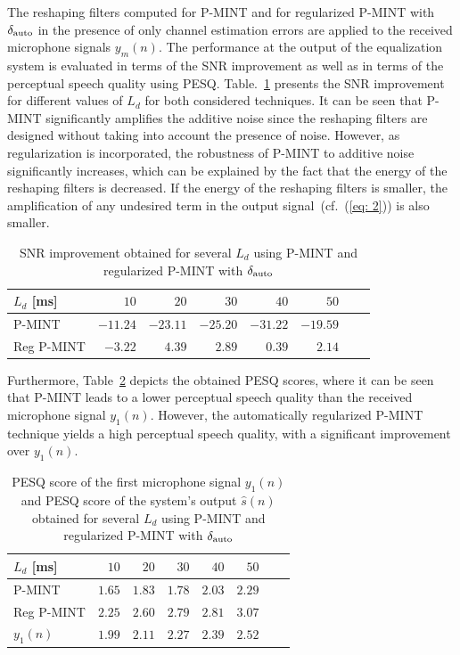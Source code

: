 \documentclass[10pt]{IEEEtran}
\begin{document}
The reshaping filters computed for P-MINT and for regularized P-MINT with $\delta_{\rm auto}$ in the presence of only channel estimation errors are applied to the received microphone signals $y_m(n)$.
The performance at the output of the equalization system is evaluated in terms of the SNR improvement as well as in terms of the perceptual speech quality using PESQ.
Table.~\ref{tbl: snr} presents the SNR improvement for different values of $L_d$ for both considered techniques.
It can be seen that P-MINT significantly amplifies the additive noise since the reshaping filters are designed without taking into account the presence of noise.
However, as regularization is incorporated, the robustness of P-MINT to additive noise significantly increases, which can be explained by the fact that the energy of the reshaping filters is decreased.
If the energy of the reshaping filters is smaller, the amplification of any undesired term in the output signal~(cf.~(\ref{eq: 2})) is also smaller.
\begin{table}[b!]
\centering
\caption{SNR improvement obtained for several $L_d$ using P-MINT and regularized P-MINT with $\delta_{\rm auto}$}
\label{tbl: snr}
\begin{tabular}{|l|r|r|r|r|r|r|r|}
\hline
$L_d$ [ms] & $10$ & $20$ & $30$ & $40$ & $50$ \\
\hline
P-MINT & $-11.24$ & $-23.11$ & $-25.20$ & $-31.22$ & $-19.59$  \\
\hline
Reg P-MINT & $-3.22$ & $4.39$ & $2.89$ & $0.39$ & $2.14$  \\
\hline
\end{tabular}

\end{table}

Furthermore, Table~\ref{tbl: pesq} depicts the obtained PESQ scores, where it can be seen that P-MINT leads to a lower perceptual speech quality than the received microphone signal $y_1(n)$. 
However, the automatically regularized P-MINT technique yields a high perceptual speech quality, with a significant improvement over $y_1(n)$.
\begin{table}[t!]
\centering
\caption{PESQ score of the first microphone signal $y_1(n)$ and PESQ score of the system's output $\hat{s}(n)$ obtained for several $L_d$ using P-MINT and regularized P-MINT with $\delta_{\rm auto}$}
\label{tbl: pesq}
\begin{tabular}{|l|r|r|r|r|r|r|r|}
\hline
$L_d$ [ms] & $10$ & $20$ & $30$ & $40$ & $50$ \\
\hline
P-MINT & $1.65$ & $1.83$ & $1.78$ & $2.03$ & $2.29$  \\
\hline
Reg P-MINT & $2.25$ & $2.60$ & $2.79$ & $2.81$ & $3.07$  \\
\hline
$y_1(n)$ & $1.99$ & $2.11$ & $2.27$ & $2.39$ & $2.52$  \\
\hline
\end{tabular}

\end{table}
\end{document}
